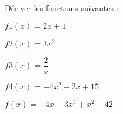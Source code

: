 Dériver les fonctions suivantes :

\begin{questions}
	
	\question[2] $f1(x) = 2x + 1$
	
	\fillwithdottedlines{1.5cm}
	
	\question[2] $f2(x) = 3x^2$
	
	\fillwithdottedlines{1.5cm}
	
	\question[2] $f3(x) = \dfrac{2}{x}$
	
	\fillwithdottedlines{1.5cm}
	
	\question[2] $f4(x) = -4x^2 - 2x + 15$
	
	\fillwithdottedlines{1.5cm}
	
	\question[2] $f(x) = -4x - 3 x^3 + x^2 - 42$
	
	\fillwithdottedlines{1.5cm}
\end{questions}